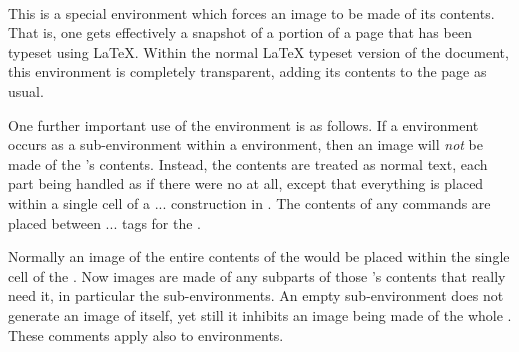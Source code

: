 \paragraph*{\label{makeimage}}
\begin{changebar}
This is a special environment which forces an image to be made of its contents.
That is, one gets effectively a snapshot of a portion of a page
that has been typeset using \LaTeX. 
Within the normal \LaTeX{} typeset version of the document, this environment 
is completely transparent, adding its contents to the page as usual.

\html{\\}%
One further important use of the  environment is as follows.
If a  environment occurs as a sub-environment within 
a  environment, then an image will \emph{not} be made of the
's contents. Instead, the contents are treated as normal text,
each part being handled as if there were no  at all,
except that everything is placed within a single cell of a
... construction in \HTMLiii. 
The contents of any 
commands are placed between ... tags 
for the .

\html{\\}%
Normally an image of the entire contents of the  would be
placed within the single cell of the .
Now images are made of any subparts of those 's contents 
that really need it, in particular the  sub-environments.
An empty  sub-environment does not generate an image of itself,
yet still it inhibits an image being made of the whole .
These comments apply also to  environments.
\end{changebar}\html{\\}




